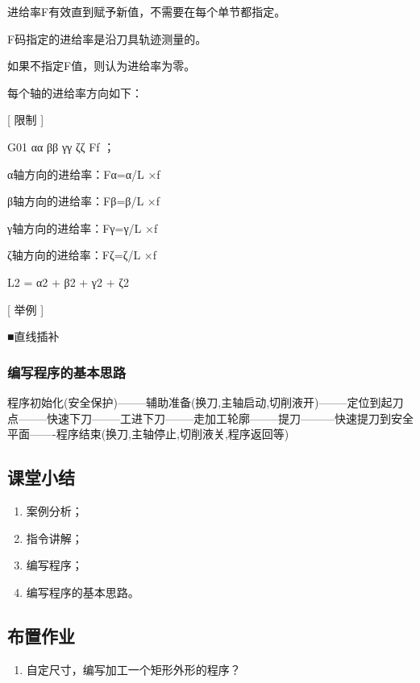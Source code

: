 进给率F有效直到赋予新值，不需要在每个单节都指定。

F码指定的进给率是沿刀具轨迹测量的。

如果不指定F值，则认为进给率为零。

每个轴的进给率方向如下：

[ 限制 ]

G01 αα ββ γγ ζζ Ff  ；

α轴方向的进给率：Fα=α/L ×f

β轴方向的进给率：Fβ=β/L ×f

γ轴方向的进给率：Fγ=γ/L ×f

ζ轴方向的进给率：Fζ=ζ/L ×f

L2 = α2 + β2 + γ2 + ζ2

[ 举例 ]

■直线插补


\subsubsection{编写程序的基本思路}
程序初始化(安全保护)--------辅助准备(换刀,主轴启动,切削液开)--------定位到起刀点--------快速下刀--------工进下刀--------走加工轮廓--------提刀---------快速提刀到安全平面-------程序结束(换刀,主轴停止,切削液关,程序返回等)
\subsection{课堂小结}
\begin{enumerate}[1、]
\item 案例分析；
\item 指令讲解；
\item 编写程序；
\item 编写程序的基本思路。
\end{enumerate}
\vfill
\subsection{布置作业}
\begin{enumerate}[1、]
	\item 自定尺寸，编写加工一个矩形外形的程序？
\end{enumerate}
\vfill